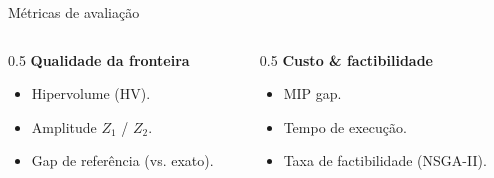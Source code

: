 \begin{frame}{Métricas de avaliação}
    \begin{columns}[T]
        \begin{column}{0.5\textwidth}
            \textbf{Qualidade da fronteira}
            \begin{itemize}
                \item Hipervolume (HV).
                \item Amplitude $Z_1$ / $Z_2$.
                \item Gap de referência (vs. exato).
            \end{itemize}
        \end{column}
        \begin{column}{0.5\textwidth}
            \textbf{Custo \& factibilidade}
            \begin{itemize}
                \item MIP gap.
                \item Tempo de execução.
                \item Taxa de factibilidade (NSGA-II).
            \end{itemize}
        \end{column}
    \end{columns}
    \vspace{0.6em}
\end{frame}
